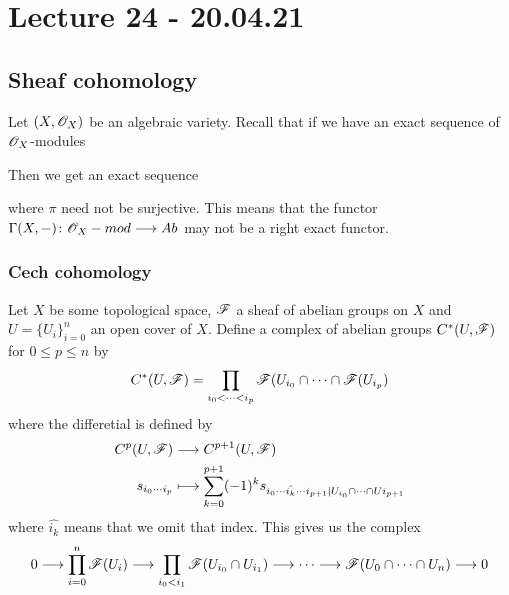 

\section{Lecture 24 - 20.04.21}

\subsection{Sheaf cohomology}

Let $(X, \mathscr{O}_X)$ be an algebraic variety. Recall that if we have an exact sequence of $\mathscr{O}_X$-modules
\begin{center}
\end{center}
Then we get an exact sequence
\begin{center}
\end{center}
where $\pi$ need not be surjective. This means that the functor $\Gamma(X, -)\colon \mathscr{O}_X-mod\longrightarrow Ab$ may not be a right exact functor. 

\subsubsection{Cech cohomology}

Let $X$ be some topological space, $\mathscr{F}$ a sheaf of abelian groups on $X$ and $U=\{U_i\}_{i=0}^n$ an open cover of $X$. Define a complex of abelian groups $C^*(U,\mathscr{F})$ for $0\leq p\leq n$ by
\begin{equation*}
    C^*(U,\mathscr{F}) = \prod_{i_0<\cdots<i_p}\mathscr{F}(U_{i_0}\cap \cdots \cap \mathscr{F}(U_{i_p})
\end{equation*}
where the differetial is defined by 
\begin{align*}
    C^p(U,\mathscr{F})&\longrightarrow C^{p+1}(U,\mathscr{F}) \\
    s_{i_0\cdots i_p}&\longmapsto \sum_{k=0}^{p+1}(-1)^k s_{i_0\cdots \hat{i_k}\cdots i_{p+1} \vert U_{i_0}\cap \cdots \cap U{i_{p+1}}}
\end{align*}
where $\hat{i_k}$ means that we omit that index. This gives us the complex
\begin{equation*}
    0\longrightarrow \prod_{i=0}^n \mathscr{F}(U_i) \longrightarrow \prod_{i_0 <i_1}\mathscr{F}(U_{i_0}\cap U_{i_1}) \longrightarrow \cdots \longrightarrow \mathscr{F}(U_0\cap \cdots \cap U_n) \longrightarrow 0
\end{equation*}

